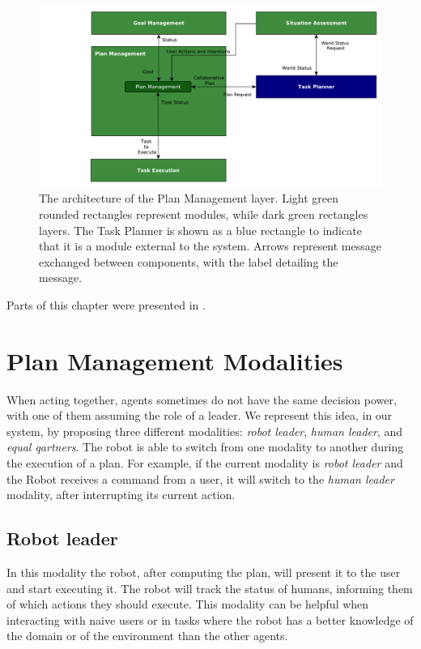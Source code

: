 \begin{figure}[ht!]
	\centering
	\includegraphics[scale=0.5]{img/coworker/plan_management/plan_management_architecture.pdf}
	\caption[The architecture of the Plan Management layer]{The architecture of the Plan Management layer. Light green rounded rectangles represent modules, while dark green rectangles layers. The Task Planner is shown as a blue rectangle to indicate that it is a module external to the system. Arrows represent message exchanged between components, with the label detailing the message.}
	\label{fig:plan_management-architecture}
\end{figure}


Parts of this chapter were presented in \cite{Lallement2014,fioreiser2014}.

\section{Plan Management Modalities}
\label{sec:plan_management-modalities}
When acting together, agents sometimes do not have the same decision power, with one of them assuming the role of a leader. We represent this idea, in our system, by proposing three different modalities: \textit{robot leader}, \textit{human leader}, and \textit{equal qartners}. The robot is able to switch from one modality to another during the execution of a plan. For example, if the current modality is \textit{robot leader} and the Robot receives a command from a user, it will switch to the \textit{human leader} modality, after interrupting its current action.

\subsection{Robot leader}
\label{subsec:plan_management-robot_leader}
In this modality the robot, after computing the plan, will present it to the user and start executing it. The robot will track the status of humans, informing them of which actions they should execute. This modality can be helpful when interacting with  naive users or in tasks where the robot has a better knowledge of the  domain or of the environment than the other agents.

